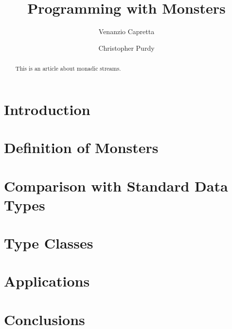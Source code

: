 \documentclass{jfp}
\begin{document}


\totalpg{\pageref{lastpage01}}

\title{Programming with Monsters}

\begin{authgrp}
\author{Venanzio Capretta}
\author{Christopher Purdy}
\end{authgrp}

\begin{abstract}
This is an article about monadic streams.
\end{abstract}

\maketitle

\section{Introduction}

\section{Definition of Monsters}

\section{Comparison with Standard Data Types}

\section{Type Classes}

\section{Applications}

\section{Conclusions}

\label{lastpage01}
\end{document}
